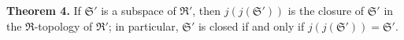\textbf{Theorem 4.} If $\mathfrak{S}'$ is a subspace of $\mathfrak{R}'$, then $j(j(\mathfrak{S}'))$ is the closure of $\mathfrak{S}'$ in the $\mathfrak{R}$-topology of $\mathfrak{R}'$; in particular, $\mathfrak{S}'$ is closed if and only if $j(j(\mathfrak{S}')) = \mathfrak{S}'$.

